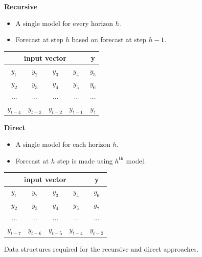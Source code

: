 \documentclass[11pt,a4paper,oneside]{book}
\begin{document}
\begin{figure}[!h]
\centering
\begin{minipage}{\textwidth}
\begin{minipage}{0.5\textwidth}
\begin{center}
\textbf{Recursive}
\begin{itemize}
\item A single model for every horizon $h$.
\item Forecast at step $h$ based on forecast at step $h-1$.
\end{itemize}
\vskip10pt
   \begin{footnotesize}
   \begin{tabular}{|cccc|c|}
   \hline
   \multicolumn{4}{|c|}{\textbf{input vector}} & \textbf{y} \\ \hline
   $y_{1}$ & $y_{2}$ & $y_{3}$ & $y_{4}$ & $y_{5}$\\ \hline
   $y_{2}$ & $y_{3}$ & $y_{4}$ & $y_{5}$ & $y_{6}$\\ \hline
   $...$ & $...$ & $...$ & $...$ & $...$\\ \hline
   $y_{t-4}$ & $y_{t-3}$ & $y_{t-2}$ & $y_{t-1}$ & $y_{t}$ \\ \hline
   \end{tabular}
   \end{footnotesize}
\end{center}
\end{minipage}
\begin{minipage}{0.5\textwidth}
\begin{center}
\textbf{Direct}
\begin{itemize}
\item A single model for each horizon $h$.
\item Forecast at $h$ step is made using $h^{\text{th}}$ model.
\end{itemize}
\vskip12pt
   \begin{footnotesize}
   \begin{tabular}{|cccc|c|}
   \hline
   \multicolumn{4}{|c|}{\textbf{input vector}} & \textbf{y} \\ \hline
   $y_{1}$ & $y_{2}$ & $y_{3}$ & $y_{4}$ & $y_{6}$ \\ \hline
   $y_{2}$ & $y_{3}$ & $y_{4}$ & $y_{5}$ & $y_{7}$ \\ \hline
   $...$ & $...$ & $...$ & $...$ & $...$ \\ \hline
   $y_{t-7}$ & $y_{t-6}$ & $y_{t-5}$ & $y_{t-4}$ & $y_{t-2}$ \\ \hline
   \end{tabular}
   \end{footnotesize}
\end{center}
\end{minipage}
\end{minipage}
\caption{Data structures required for the recursive and direct approaches.}
\label{fig:recursive}
\end{figure}
\end{document}
